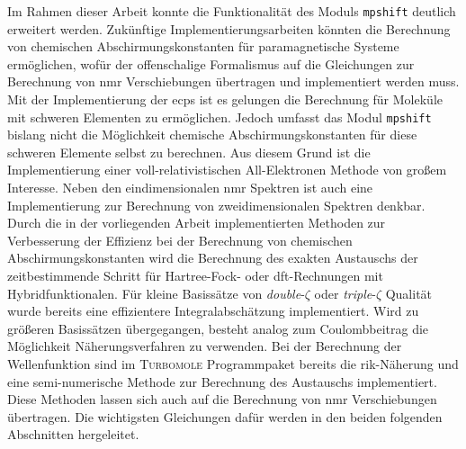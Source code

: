 Im Rahmen dieser Arbeit konnte die Funktionalität des Moduls \texttt{mpshift} deutlich erweitert werden. Zukünftige Implementierungsarbeiten könnten die Berechnung von chemischen Abschirmungskonstanten für paramagnetische Systeme ermöglichen, wofür der offenschalige Formalismus auf die Gleichungen zur Berechnung von \ac{nmr} Verschiebungen übertragen und implementiert werden muss. Mit der Implementierung der \acp{ecp} ist es gelungen die Berechnung für Moleküle mit schweren Elementen zu ermöglichen. Jedoch umfasst das Modul \texttt{mpshift} bislang nicht die Möglichkeit chemische Abschirmungskonstanten für diese schweren Elemente selbst zu berechnen. Aus diesem Grund ist die Implementierung einer voll-relativistischen All-Elektronen Methode von großem Interesse. Neben den eindimensionalen \ac{nmr} Spektren ist auch eine Implementierung zur Berechnung von zweidimensionalen Spektren denkbar.  
Durch die in der vorliegenden Arbeit implementierten Methoden zur Verbesserung der Effizienz bei der Berechnung von chemischen Abschirmungskonstanten wird die Berechnung des exakten Austauschs der zeitbestimmende Schritt für Hartree-Fock- oder \ac{dft}-Rechnungen mit Hybridfunktionalen. Für kleine Basissätze von \textit{double}-$\zeta$ oder \textit{triple}-$\zeta$ Qualität wurde bereits eine effizientere Integralabschätzung implementiert. Wird zu größeren Basissätzen übergegangen, besteht analog zum Coulombbeitrag die Möglichkeit Näherungsverfahren zu verwenden. Bei der Berechnung der Wellenfunktion sind im \textsc{Turbomole} Programmpaket bereits die \ac{rik}-Näherung\supercite{weigend2002fully} und eine semi-numerische Methode\supercite{plessow2012seminumerical} zur Berechnung des Austauschs implementiert. Diese Methoden lassen sich auch auf die Berechnung von \ac{nmr} Verschiebungen übertragen. Die wichtigsten Gleichungen dafür werden in den beiden folgenden Abschnitten hergeleitet. 

